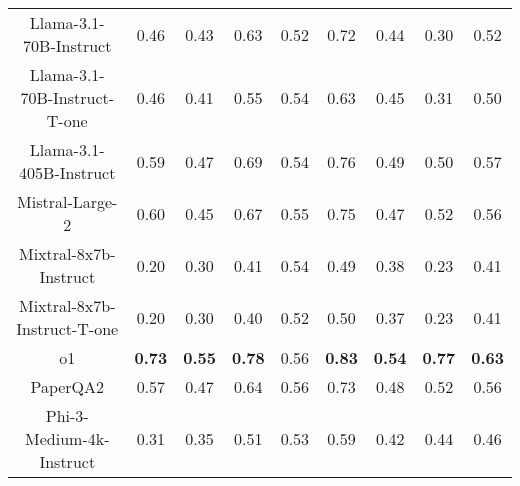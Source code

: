 \begin{tabular}{ccccccccc}
Llama-3.1-70B-Instruct & 0.46 & 0.43 & 0.63 & 0.52 & 0.72 & 0.44 & 0.30 & 0.52 \\
Llama-3.1-70B-Instruct-T-one & 0.46 & 0.41 & 0.55 & 0.54 & 0.63 & 0.45 & 0.31 & 0.50 \\
Llama-3.1-405B-Instruct & 0.59 & 0.47 & 0.69 & 0.54 & 0.76 & 0.49 & 0.50 & 0.57 \\
Mistral-Large-2 & 0.60 & 0.45 & 0.67 & 0.55 & 0.75 & 0.47 & 0.52 & 0.56 \\
Mixtral-8x7b-Instruct & 0.20 & 0.30 & 0.41 & 0.54 & 0.49 & 0.38 & 0.23 & 0.41 \\
Mixtral-8x7b-Instruct-T-one & 0.20 & 0.30 & 0.40 & 0.52 & 0.50 & 0.37 & 0.23 & 0.41 \\
o1 & \textbf{0.73} & \textbf{0.55} & \textbf{0.78} & 0.56 & \textbf{0.83} & \textbf{0.54} & \textbf{0.77} & \textbf{0.63} \\
PaperQA2 & 0.57 & 0.47 & 0.64 & 0.56 & 0.73 & 0.48 & 0.52 & 0.56 \\
Phi-3-Medium-4k-Instruct & 0.31 & 0.35 & 0.51 & 0.53 & 0.59 & 0.42 & 0.44 & 0.46 \\
\bottomrule
\end{tabular}
